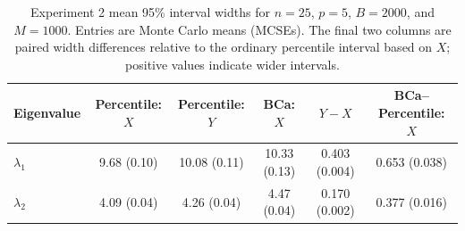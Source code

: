 \begin{table}[htbp]
\centering
\small
\caption{Experiment 2 mean 95\% interval widths for $n=25$, $p=5$, $B=2000$, and $M=1000$. Entries are Monte Carlo means (MCSEs). The final two columns are paired width differences relative to the ordinary percentile interval based on $X$; positive values indicate wider intervals.}
\label{tab:exp2_widths}
\begin{tabular}{lccccc}
\hline\hline
\textbf{Eigenvalue} & \textbf{Percentile: $X$} & \textbf{Percentile: $Y$} & \textbf{BCa: $X$} & \textbf{$Y-X$} & \textbf{BCa--Percentile: $X$} \\
\hline
$\lambda_1$ & 9.68 (0.10) & 10.08 (0.11) & 10.33 (0.13) & 0.403 (0.004) & 0.653 (0.038) \\
$\lambda_2$ & 4.09 (0.04) & 4.26 (0.04) & 4.47 (0.04) & 0.170 (0.002) & 0.377 (0.016) \\
\hline\hline
\end{tabular}
\end{table}

